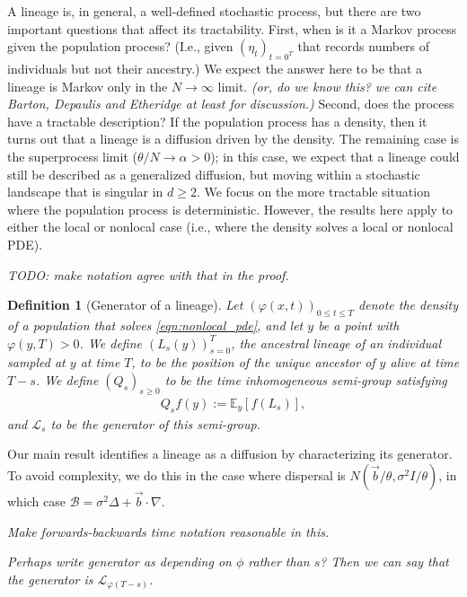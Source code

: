 \documentclass[12pt]{article}
\newtheorem{definition}[theorem]{Definition}
\newcommand{\IE}{\mathbb E}
\newcommand{\grad}{\nabla}
\newcommand{\DG}{\mathcal{B}}  %
\newcommand{\meanq}{\vec b}    %
\newcommand{\Lgen}{\mathcal{L}}    %
\newcommand{\comment}[1]{{\color{blue} \it #1}}
\begin{document}
A lineage is, in general, a well-defined stochastic process,
but there are two important questions
that affect its tractability.
First, when is it a Markov process given the population process?
(I.e., given $(\eta_t)_{t=0^T}$ that records numbers of individuals
but not their ancestry.)
We expect the answer here to be that a lineage is Markov
only in the $N \to \infty$ limit.
\comment{(or, do we know this? we can cite Barton, Depaulis and Etheridge at least for discussion.)}
Second, does the process have a tractable description?
If the population process has a density,
then it turns out that a lineage is a diffusion driven by the density.
The remaining case is the superprocess limit ($\theta/N \to \alpha > 0$);
in this case, we expect that a lineage could still be described as a generalized diffusion,
but moving within a stochastic landscape that is singular in $d \ge 2$.
We focus on the more tractable situation where the population process is deterministic.
However, the results here apply to either the local or nonlocal case
(i.e., where the density solves a local or nonlocal PDE).

\comment{
    TODO: make notation agree with that in the proof.
}


\begin{definition}[Generator of a lineage] \label{def:lineage_generator}
    Let $(\varphi(x, t))_{0 \le t \le T}$
    denote the density of a population that solves \eqref{eqn:nonlocal_pde},
    and let $y$ be a point with $\varphi(y, T) > 0$.
    We define $(L_s(y))_{s=0}^T$,
    the ancestral lineage of an individual sampled at $y$ at time $T$,
    to be the position of the unique ancestor of $y$ alive at time $T - s$.
    We define
    $(Q_s)_{s \geq 0}$
    to be the time inhomogeneous semi-group satisfying
    \begin{align*}
        Q_s f(y) := \IE_y[ f(L_s) ] ,
    \end{align*}
    and $\Lgen_s$ to be the generator of this semi-group.
\end{definition}

Our main result identifies a lineage as a diffusion
by characterizing its generator.
To avoid complexity,
we do this in the case where dispersal is $N(\meanq/\theta, \sigma^2 I/\theta)$,
in which case $\DG = \sigma^2 \Delta + \meanq \cdot \grad$.

\comment{Make forwards-backwards time notation reasonable in this.}

\comment{Perhaps write generator as depending on $\phi$ rather than $s$?
    Then we can say that the generator is $\Lgen_{\varphi(T-s)}$.}
\end{document}
